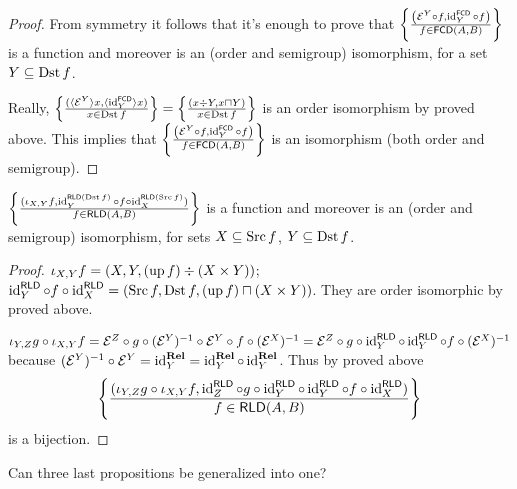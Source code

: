 \begin{proof}
  From symmetry it follows that it's enough to prove that $\left\{ \frac{ \left(
  \mathcal{E}^Y \circ f , \operatorname{id}^{\mathsf{FCD}}_Y \circ f \right)
  }{ f \in \mathsf{FCD} (A , B) }\right\}$ is a
  function and moreover is an (order and semigroup) isomorphism, for a set $Y
  \subseteq \operatorname{Dst} f$.
  
  Really, $\left\{ \frac{ (\langle \mathcal{E}^Y \rangle x , \langle
  \operatorname{id}^{\mathsf{FCD}}_Y \rangle x) }{ x
  \in \operatorname{Dst} f }\right\} = \left\{ \frac{ (x \div Y , x \sqcap Y) }{
  x \in \operatorname{Dst} f }\right\}$ is an order isomorphism by proved
  above. This implies that $\left\{ \frac{ \left( \mathcal{E}^Y \circ f ,
  \operatorname{id}^{\mathsf{FCD}}_Y \circ f \right) }{
  f \in \mathsf{FCD} (A , B) }\right\}$ is an isomorphism
  (both order and semigroup).
\end{proof}

\begin{prop}
  $\left\{ \frac{ (\iota_{X, Y} f , \operatorname{id}^{\mathsf{RLD}(\operatorname{Dst} f)}_Y \circ f \circ
  \operatorname{id}^{\mathsf{RLD}(\operatorname{Src} f)}_X) }{ f \in
  \mathsf{RLD} (A , B) }\right\}$ is a function and moreover is an
  (order and semigroup) isomorphism, for sets $X \subseteq \operatorname{Src} f$, $Y
  \subseteq \operatorname{Dst} f$.
\end{prop}

\begin{proof}
  $\iota_{X, Y} f = (X , Y , (\operatorname{up} f) \div (X \times Y))$;
  $\operatorname{id}^{\mathsf{RLD}}_Y \circ f \circ
  \operatorname{id}^{\mathsf{RLD}}_X = (\operatorname{Src} f , \operatorname{Dst} f ,
  (\operatorname{up} f) \sqcap (X \times Y))$. They are order isomorphic by proved
  above.
  
  $\iota_{Y, Z} g \circ \iota_{X, Y} f =\mathcal{E}^Z \circ g \circ
  (\mathcal{E}^Y)^{- 1} \circ \mathcal{E}^Y \circ f \circ (\mathcal{E}^X)^{-
  1} =\mathcal{E}^Z \circ g \circ \operatorname{id}^{\mathsf{RLD}}_Y \circ
  \operatorname{id}^{\mathsf{RLD}}_Y \circ f \circ (\mathcal{E}^X)^{- 1}$
  because $(\mathcal{E}^Y)^{- 1} \circ \mathcal{E}^Y =
  \operatorname{id}^{\mathbf{Rel}}_Y = \operatorname{id}^{\mathbf{Rel}}_Y
  \circ \operatorname{id}^{\mathbf{Rel}}_Y$. Thus by proved above
  \[ \left\{ \frac{ (\iota_{Y, Z} g \circ \iota_{X, Y} f ,
     \operatorname{id}^{\mathsf{RLD}}_Z \circ g \circ
     \operatorname{id}^{\mathsf{RLD}}_Y \circ \operatorname{id}^{\mathsf{RLD}}_Y
     \circ f \circ \operatorname{id}^{\mathsf{RLD}}_X) }{
     f \in \mathsf{RLD} (A , B) }\right\} \]
  is a bijection.
\end{proof}

Can three last propositions be generalized into one?
